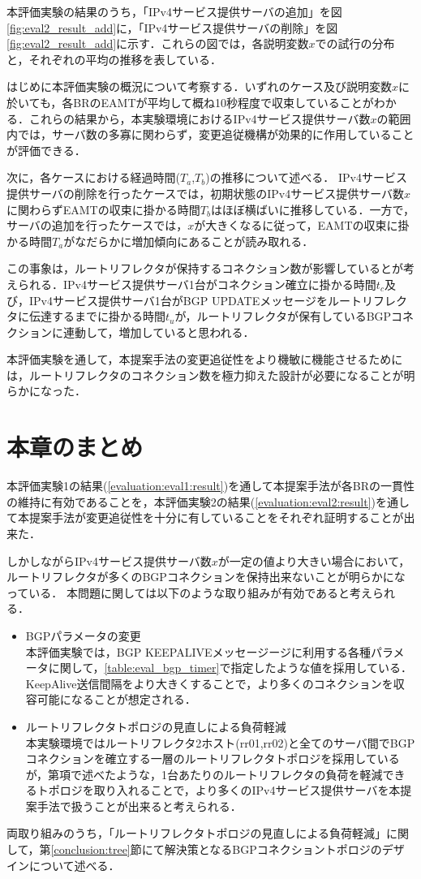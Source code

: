 本評価実験の結果のうち，「IPv4サービス提供サーバの追加」を図\ref{fig:eval2_result_add}に，「IPv4サービス提供サーバの削除」を図\ref{fig:eval2_result_add}に示す．これらの図では，各説明変数$x$での試行の分布と，それぞれの平均の推移を表している．

はじめに本評価実験の概況について考察する．いずれのケース及び説明変数$x$に於いても，各BRのEAMTが平均して概ね10秒程度で収束していることがわかる．これらの結果から，本実験環境におけるIPv4サービス提供サーバ数$x$の範囲内では，サーバ数の多寡に関わらず，変更追従機構が効果的に作用していることが評価できる．


次に，各ケースにおける経過時間($T_a$,$T_b$)の推移について述べる．
IPv4サービス提供サーバの削除を行ったケースでは，初期状態のIPv4サービス提供サーバ数$x$に関わらずEAMTの収束に掛かる時間$T_b$はほぼ横ばいに推移している．一方で，サーバの追加を行ったケースでは，$x$が大きくなるに従って，EAMTの収束に掛かる時間$T_a$がなだらかに増加傾向にあることが読み取れる．

この事象は，ルートリフレクタが保持するコネクション数が影響しているとが考えられる．IPv4サービス提供サーバ1台がコネクション確立に掛かる時間$t_c$及び，IPv4サービス提供サーバ1台がBGP UPDATEメッセージをルートリフレクタに伝達するまでに掛かる時間$t_u$が，ルートリフレクタが保有しているBGPコネクションに連動して，増加していると思われる．


本評価実験を通して，本提案手法の変更追従性をより機敏に機能させるためには，ルートリフレクタのコネクション数を極力抑えた設計が必要になることが明らかになった．



\newpage
\section{本章のまとめ}
\label{evaluation:consideration}
本評価実験1の結果(\ref{evaluation:eval1:result})を通して本提案手法が各BRの一貫性の維持に有効であることを，本評価実験2の結果(\ref{evaluation:eval2:result})を通して本提案手法が変更追従性を十分に有していることをそれぞれ証明することが出来た．

しかしながらIPv4サービス提供サーバ数$x$が一定の値より大きい場合において，ルートリフレクタが多くのBGPコネクションを保持出来ないことが明らかになっている．
本問題に関しては以下のような取り組みが有効であると考えられる．

\begin{itemize}
    \item BGPパラメータの変更 \\
    本評価実験では，BGP KEEPALIVEメッセージージに利用する各種パラメータに関して，\ref{table:eval_bgp_timer}で指定したような値を採用している．KeepAlive送信間隔をより大きくすることで，より多くのコネクションを収容可能になることが想定される．
    \item ルートリフレクタトポロジの見直しによる負荷軽減 \\
    本実験環境ではルートリフレクタ2ホスト(rr01,rr02)と全てのサーバ間でBGPコネクションを確立する一層のルートリフレクタトポロジを採用しているが，第\label{proposal:network_rr}項で述べたような，1台あたりのルートリフレクタの負荷を軽減できるトポロジを取り入れることで，より多くのIPv4サービス提供サーバを本提案手法で扱うことが出来ると考えられる．
\end{itemize}

両取り組みのうち，「ルートリフレクタトポロジの見直しによる負荷軽減」に関して，第\ref{conclusion:tree}節にて解決策となるBGPコネクショントポロジのデザインについて述べる．


